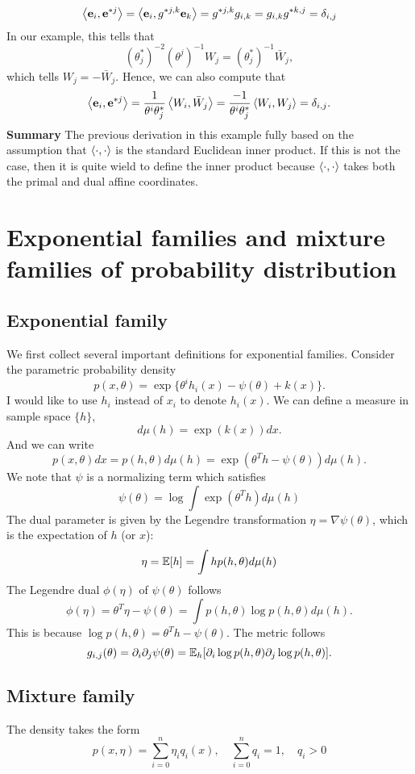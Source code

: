 \documentclass[11pt]{article}
\begin{document}
\begin{example}
$$
\left\langle \mathbf{e}_i,\mathbf{e}^{*j}\right\rangle=\left\langle \mathbf{e}_i,g^{*j,k}\mathbf{e}_k\right\rangle=g^{*j,k}g_{i,k}=g_{i,k}g^{*k,j}=\delta_{i,j}
$$
In our example, this tells that
$$
(\theta_j^*)^{-2}(\theta^j)^{-1}W_j=(\theta_j^*)^{-1}\bar W_j,
$$
which tells $W_j=-\bar W_j$. Hence, we can also compute that
$$
\left\langle \mathbf{e}_i,\mathbf{e}^{*j}\right\rangle=\frac{1}{\theta^i\theta_j^*}\left\langle W_i,\bar W_j\right\rangle=\frac{-1}{\theta^i\theta_j^*}\left\langle W_i,W_j\right\rangle=\delta_{i,j}.
$$
\textbf{Summary} The previous derivation in this example fully based on the assumption that $\left\langle \cdot,\cdot\right\rangle$ is the standard Euclidean inner product. If this is not the case, then it is quite wield to define the inner product because $\left\langle \cdot,\cdot\right\rangle$ takes both the primal and dual affine coordinates.
\end{example}

\section{Exponential families and mixture families of probability distribution}
\subsection{Exponential family}
We first collect several important definitions for exponential families. Consider the parametric probability density
$$
p(x,\theta) = \exp\{\theta^ih_i(x)-\psi(\theta)+k(x)\}.
$$
I would like to use $h_i$ instead of $x_i$ to denote $h_i(x)$. We can define a measure in sample space $\{h\}$, 
$$
d\mu(h) = \exp(k(x))dx.
$$
And we can write
$$
p(x,\theta)dx = p(h,\theta)d\mu(h)= \exp(\theta^Th-\psi(\theta))d\mu(h).
$$
We note that $\psi$ is a normalizing term which satisfies
$$
\psi(\theta) = \log\int \exp(\theta^Th)d\mu(h)
$$
The dual parameter is given by the Legendre transformation $\eta=\nabla \psi(\theta)$, which is the expectation of $h$ (or $x$):
$$
\eta = \mathbb{E}[h] = \int h p(h,\theta)d\mu(h)
$$
The Legendre dual $\phi(\eta)$ of $\psi(\theta)$ follows
$$
\phi(\eta) = \theta^T\eta-\psi(\theta) = \int p(h,\theta)\log p(h,\theta) d\mu(h).
$$
This is because $\log p(h,\theta)=\theta^Th-\psi(\theta)$. The metric follows
$$
g_{i,j}(\theta) = \partial_i\partial_j\psi(\theta) = \mathbb{E}_h[\partial_i\log p(h,\theta)\partial_j\log p(h,\theta)].
$$
\subsection{Mixture family}
The density takes the form
$$
p(x,\eta)=\sum_{i=0}^n\eta_iq_i(x), \quad \sum_{i=0}^nq_i=1,\quad q_i>0
$$

\printbibliography
\end{document}

